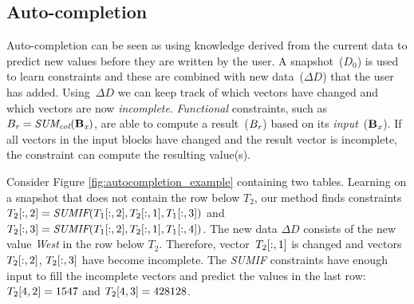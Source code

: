 \subsection{Auto-completion}
Auto-completion can be seen as using knowledge derived from the current data to predict new values before they are written by the user.
A snapshot~($D_0$) is used to learn constraints and these are combined with new data~($\Delta D$) that the user has added.
Using~$\Delta D$ we can keep track of which vectors have changed and which vectors are now \textit{incomplete}.
\textit{Functional} constraints, such as $B_{\textit{r}} = \textit{SUM\textsubscript{col}}(\mathbf{B_{\textit{x}}})$, are able to compute a result~($B_{\textit{r}}$) based on its \textit{input}~($\mathbf{B_{\textit{x}}}$).
If all vectors in the input blocks have changed and the result vector is incomplete, the constraint can compute the resulting value(s).

Consider Figure \ref{fig:autocompletion_example} containing two tables.
Learning on a snapshot that does not contain the row below $T_2$, our method finds constraints $T_2[:,2] = \textit{SUMIF}(T_1[:,2], T_2[:,1], T_1[:,3])$ and $T_2[:,3] = \textit{SUMIF}(T_1[:,2], T_2[:,1], T_1[:,4])$.
The new data $\Delta D$ consists of the new value \textit{West} in the row below $T_2$.
Therefore, vector~$T_2[:,1]$ is changed and vectors~$T_2[:,2]$, $T_2[:,3]$ have become incomplete.
The \textit{SUMIF} constraints have enough input to fill the incomplete vectors and predict the values in the last row: $T_2[4,2] = 1547$ and $T_2[4,3] = 428128$.


